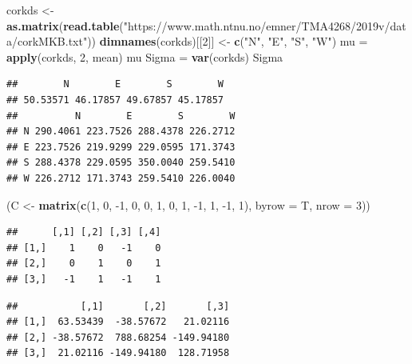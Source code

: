 \documentclass[ignorenonframetext,]{beamer}
\newenvironment{Shaded}{\begin{snugshade}}{\end{snugshade}}
\newcommand{\KeywordTok}[1]{\textcolor[rgb]{0.13,0.29,0.53}{\textbf{#1}}}
\newcommand{\DataTypeTok}[1]{\textcolor[rgb]{0.13,0.29,0.53}{#1}}
\newcommand{\DecValTok}[1]{\textcolor[rgb]{0.00,0.00,0.81}{#1}}
\newcommand{\StringTok}[1]{\textcolor[rgb]{0.31,0.60,0.02}{#1}}
\newcommand{\OperatorTok}[1]{\textcolor[rgb]{0.81,0.36,0.00}{\textbf{#1}}}
\newcommand{\NormalTok}[1]{#1}
\begin{document}
\begin{frame}[fragile]

\tiny

\begin{Shaded}
\begin{Highlighting}[]
\NormalTok{corkds <-}\StringTok{ }\KeywordTok{as.matrix}\NormalTok{(}\KeywordTok{read.table}\NormalTok{(}\StringTok{"https://www.math.ntnu.no/emner/TMA4268/2019v/data/corkMKB.txt"}\NormalTok{))}
\KeywordTok{dimnames}\NormalTok{(corkds)[[}\DecValTok{2}\NormalTok{]] <-}\StringTok{ }\KeywordTok{c}\NormalTok{(}\StringTok{"N"}\NormalTok{, }\StringTok{"E"}\NormalTok{, }\StringTok{"S"}\NormalTok{, }\StringTok{"W"}\NormalTok{)}
\NormalTok{mu =}\StringTok{ }\KeywordTok{apply}\NormalTok{(corkds, }\DecValTok{2}\NormalTok{, mean)}
\NormalTok{mu}
\NormalTok{Sigma =}\StringTok{ }\KeywordTok{var}\NormalTok{(corkds)}
\NormalTok{Sigma}
\end{Highlighting}
\end{Shaded}

\begin{verbatim}
##        N        E        S        W 
## 50.53571 46.17857 49.67857 45.17857 
##          N        E        S        W
## N 290.4061 223.7526 288.4378 226.2712
## E 223.7526 219.9299 229.0595 171.3743
## S 288.4378 229.0595 350.0040 259.5410
## W 226.2712 171.3743 259.5410 226.0040
\end{verbatim}

\begin{Shaded}
\begin{Highlighting}[]
\NormalTok{(C <-}\StringTok{ }\KeywordTok{matrix}\NormalTok{(}\KeywordTok{c}\NormalTok{(}\DecValTok{1}\NormalTok{, }\DecValTok{0}\NormalTok{, }\DecValTok{-1}\NormalTok{, }\DecValTok{0}\NormalTok{, }\DecValTok{0}\NormalTok{, }\DecValTok{1}\NormalTok{, }\DecValTok{0}\NormalTok{, }\DecValTok{1}\NormalTok{, }\DecValTok{-1}\NormalTok{, }\DecValTok{1}\NormalTok{, }\DecValTok{-1}\NormalTok{, }\DecValTok{1}\NormalTok{), }\DataTypeTok{byrow =}\NormalTok{ T, }\DataTypeTok{nrow =} \DecValTok{3}\NormalTok{))}
\end{Highlighting}
\end{Shaded}

\begin{verbatim}
##      [,1] [,2] [,3] [,4]
## [1,]    1    0   -1    0
## [2,]    0    1    0    1
## [3,]   -1    1   -1    1
\end{verbatim}

\begin{Shaded}
\end{Shaded}

\begin{verbatim}
##           [,1]       [,2]       [,3]
## [1,]  63.53439  -38.57672   21.02116
## [2,] -38.57672  788.68254 -149.94180
## [3,]  21.02116 -149.94180  128.71958
\end{verbatim}

\end{frame}
\end{document}
